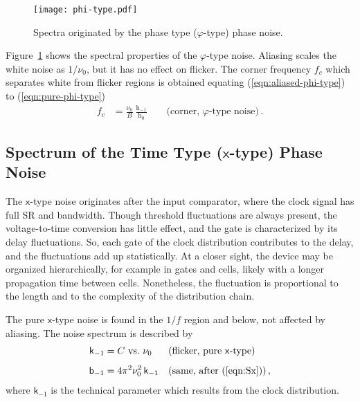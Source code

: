 \documentclass{article}
\newcommand{\req}[1]{(\ref{#1})}
\begin{document}
\begin{figure}[t]
\centering\texttt{[image: phi-type.pdf]}
\caption{Spectra originated by the phase type ($\varphi$-type) phase noise.}
\label{fig:phi-type}
\end{figure}
Figure~\ref{fig:phi-type} shows the spectral properties of the $\varphi$-type noise.  
Aliasing scales the white noise as $1/\nu_0$, but it has no effect on flicker.  The corner frequency $f_c$ which separates white from flicker regions is obtained equating \req{eqn:aliased-phi-type} to \req{eqn:pure-phi-type}%
\begin{align}
\label{eqn:corner-phi}
f_c&=\frac{\nu_0}{B}\:\frac{\mathrm{h}_{-1}}{\mathrm{h}_0}
\qquad\text{(corner, $\varphi$-type noise)}\,.
\end{align}



\subsection{Spectrum of the Time Type ($\mathsf{x}$-type) Phase Noise}\label{ssec:x-type}
The $\mathsf{x}$-type noise originates after the input comparator, where the clock signal has full SR and bandwidth.
Though threshold fluctuations are always present, the voltage-to-time conversion has little effect, and the gate is characterized by its delay fluctuations.
So, each gate of the clock distribution contributes to the delay, and the fluctuations add up statistically.
At a closer sight, the device may be organized hierarchically, for example in gates and cells, likely with a longer propagation time between cells.
Nonetheless, the fluctuation is proportional to the length and to the complexity of the distribution chain. 

The pure $\mathsf{x}$-type noise is found in the $1/f$ region and below, not affected by aliasing.  The noise spectrum is described by
\begin{align}
\label{eqn:pure-x-type}
\mathsf{k}_{-1}&=C~\text{vs.\ $\nu_0$}
&&\text{(flicker, pure \textsf{x}-type)}\\[1ex]
\label{eqn:pure-x-type-phi}
\mathsf{b}_{-1}&=4\pi^2\nu_0^2\,\mathsf{k}_{-1}
&&\text{(same, after \req{eqn:Sx})}\,,
\end{align}
where $\mathsf{k}_{-1}$ is the technical parameter which results from the clock distribution.
\end{document}
